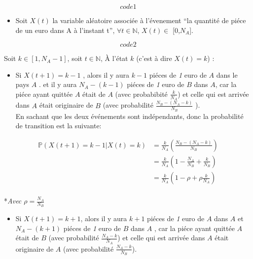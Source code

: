 \documentclass[11pt,]{article}
\providecommand{\tightlist}{%
  \setlength{\itemsep}{0pt}\setlength{\parskip}{0pt}}
\begin{document}
\[code 1\]

\begin{itemize}
\tightlist
\item
  Soit \(X(t)\) la variable aléatoire associée à l'évenement ``la
  quantité de piéce de un euro dans A à l'instant t'',
  \(\forall t\in \mathbb{N}\), \(X(t)\in\) {[}0,\(N_A\){]}.
\end{itemize}

\[code2\]

Soit \(k \in [1,N_A-1]\), soit \(t \in \mathbb{N}\), À l'état \(k\)
(c'est à dire \(X(t)=k\)) :

\begin{itemize}
\tightlist
\item
  Si \(X(t+1)=k-1\) , alors il y aura \(k-1\) piéces de \emph{1} euro de
  \(A\) dans le pays \(A\) . et il y aura \(N_A-(k-1)\) piéces de
  \emph{1} euro de \(B\) dans \(A\), car la piéce ayant quittée \(A\)
  était de \(A\) (avec probabibité \(\frac{k}{N_A}\)) et celle qui est
  arrivée dans \(A\) était originaire de \(B\) (avec probabilité
  \(\frac{N_B-(N_A-k)}{N_B}\) ).\\
  En sachant que les deux événements sont indépendants, donc la
  probabilité de transition est la suivante:
\end{itemize}

\begin{equation} 
\begin{split}
\mathbb{P}(X(t+1) =k-1|X(t)=k) &=\frac{k}{N_A}(\frac{N_B-(N_A-k)}{N_B} ) \\
&=\frac{k}{N_A}(1-\frac{N_A}{N_B}+\frac{k}{N_B})\\
&=\frac{k}{N_A}(1-\rho+\rho \frac{k}{N_A})  \\
\end{split}
\end{equation}

\begin{flushright}
*\emph{Avec $\rho=\frac{N_A}{N_B}$}
\end{flushright}

\begin{itemize}
\tightlist
\item
  Si \(X(t+1)=k+1\), alors il y aura \(k+1\) piéces de \emph{1} euro de
  \(A\) dans \(A\) et \(N_A-(k+1)\) piéces de \emph{1} euro de \(B\)
  dans \(A\) , car la piéce ayant quittée \(A\) était de \(B\) (avec
  probabilité \(\frac{N_A-k}{N_A}\)) et celle qui est arrivée dans \(A\)
  était originaire de \(A\) (avec probabilité \(\frac{N_A-k}{N_B}\)).
\end{itemize}
\end{document}
